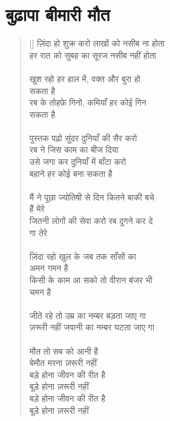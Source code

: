 \chapter{\texthindi{
बुढ़ापा बीमारी मौत
}} 
\begin{verse}[\versewidth]\texthindi{
ज़िंदा हो शुक्र करो लाखों को नसीब ना होता \\
हर रात को सुबह का सूरज नसीब नहीं होता\\
\\
खुश रहो हर हाल में, वक्त और बुरा हो\\
सकता है\\
रब के तोहफ़े गिनो, कमियाँ हर कोई गिन\\
सकता है \\
\\
पुस्तक पढ़ो सुंदर दुनियाँ की सैर करो \\
रब ने जिस काम का बीज दिया \\
उसे जगा कर दुनियाँ में बाँटा करो \\
बहाने हर कोई बना सकता है \\
\\
मैं ने पूछा ज्योतिषी से दिन कितने बाकी बचे\\
हैं मेरे\\
जितनी लोगों की सेवा करो रब दुगने कर दे\\
गा तेरे\\
\\
ज़िंदा रहो खुल के जब तक साँसों का \\
अमन गमन है \\
किसी के काम आ सको तो वीरान बंजर भी \\
चमन है \\
\\
जीते रहे तो उम्र का नम्बर बड़ता जाए गा\\
ज़रूरी नहीं जवानी का नम्बर घटता जाए गा\\
\\
मौत तो सब को आनी है\\
बेमौत मरना ज़रूरी नहीं\\
बड़े होना जीवन की रीत है\\
बूड़े होना ज़रूरी नहीं\\
बड़े होना जीवन की रीत है\\
बूड़े होना ज़रूरी नहीं
}\end{verse}

